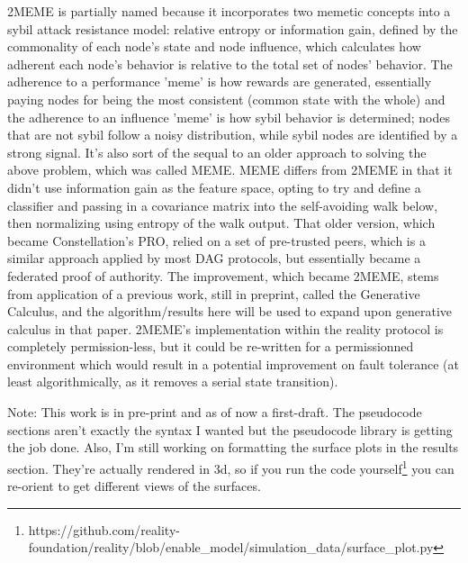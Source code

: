 \documentclass{article}
\theoremstyle{definition}
\theoremstyle{remark}
\theoremstyle{plain}
\begin{document}
2MEME is partially named because it incorporates two memetic concepts into a sybil attack resistance model: relative entropy or information gain, defined by the commonality of each node's state and node influence, which calculates how adherent each node's behavior is relative to the total set of nodes' behavior. The adherence to a performance 'meme' is how rewards are generated, essentially paying nodes for being the most consistent (common state with the whole) and the adherence to an influence 'meme' is how sybil behavior is determined; nodes that are not sybil follow a noisy distribution, while sybil nodes are identified by a strong signal. It's also sort of the sequal to an older approach to solving the above problem, which was called MEME. MEME differs from 2MEME in that it didn't use information gain as the feature space, opting to try and define a classifier and passing in a covariance matrix into the self-avoiding walk below, then normalizing using entropy of the walk output. That older version, which became Constellation's PRO, relied on a set of pre-trusted peers, which is a similar approach applied by most DAG protocols, but essentially became a federated proof of authority. The improvement, which became 2MEME, stems from application of a previous work, still in preprint, called the Generative Calculus, and the algorithm/results here will be used to expand upon generative calculus in that paper. 2MEME's implementation within the reality protocol is completely permission-less, but it could be re-written for a permissionned environment which would result in a potential improvement on fault tolerance (at least algorithmically, as it removes a serial state transition).

Note: This work is in pre-print and as of now a first-draft. The pseudocode sections aren't exactly the syntax I wanted but the pseudocode library is getting the job done. Also, I'm still working on formatting the surface plots in the results section. They're actually rendered in 3d, so if you run the code yourself\footnote{https://github.com/reality-foundation/reality/blob/enable\_model/simulation\_data/surface\_plot.py} you can re-orient to get different views of the surfaces.
\end{document}
